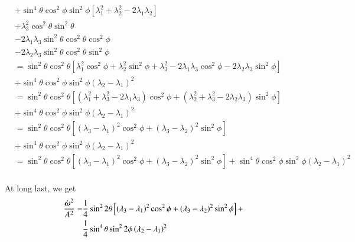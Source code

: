\documentclass[preprint,12pt,authoryear]{elsarticle}
\newcommand{\mitbf}[1]{\hbox{\mathversion{bold}$#1$}}
\begin{document}
\begin{equation}
\begin{aligned}
&+ \sin^4{\theta} \cos^2{\phi}\sin^2{\phi} \left[ \lambda_1^2 + \lambda_2^2 -2 \lambda_1\lambda_2 \right] \\
&+ \lambda_3^2 \cos^2{\theta}\sin^2{\theta} \\
&- 2 \lambda_1 \lambda_3 \sin^2{\theta} \cos^2{\theta} \cos^2{\phi} \\
&- 2 \lambda_2 \lambda_3 \sin^2{\theta} \cos^2{\theta} \sin^2{\phi} \\ 
&=
\sin^2{\theta}\cos^2{\theta} \left[\lambda_1^2 \cos^2{\phi} + \lambda_2^2 \sin^2{\phi} + \lambda_3^2 - 2 \lambda_1 \lambda_3 \cos^2{\phi} - 2 \lambda_2 \lambda_3 \sin^2{\phi} \right] \\
&+ \sin^4{\theta} \cos^2{\phi}\sin^2{\phi} \left( \lambda_2 - \lambda_1 \right)^2 \\
&=
\sin^2{\theta}\cos^2{\theta} \left[( \lambda_1^2 + \lambda_3^2 - 2 \lambda_1 \lambda_3) \cos^2{\phi} + (\lambda_2^2 + \lambda_3^2 - 2 \lambda_2 \lambda_3 ) \sin^2{\phi} \right] \\
&+ \sin^4{\theta} \cos^2{\phi}\sin^2{\phi} \left( \lambda_2 - \lambda_1 \right)^2 \\
&=
\sin^2{\theta}\cos^2{\theta} \left[( \lambda_3 - \lambda_1)^2 \cos^2{\phi} + (\lambda_3 - \lambda_2)^2 \sin^2{\phi} \right] \\
&+ \sin^4{\theta} \cos^2{\phi}\sin^2{\phi} \left( \lambda_2 - \lambda_1 \right)^2 \\
&=
\sin^2{\theta}\cos^2{\theta} \left[( \lambda_3 - \lambda_1)^2 \cos^2{\phi} + (\lambda_3 - \lambda_2)^2 \sin^2{\phi} \right]
+ \sin^4{\theta} \cos^2{\phi}\sin^2{\phi} \left( \lambda_2 - \lambda_1 \right)^2 \\
\end{aligned}
\end{equation}

At long last, we get
\begin{equation}
\begin{aligned}
\frac{\dot{\mitbf{\omega}}^2}{A^2}  = 
&\frac{1}{4}\sin^2{2\theta} \left[( \lambda_3 - \lambda_1)^2 \cos^2{\phi} + (\lambda_3 - \lambda_2)^2 \sin^2{\phi} \right] +\\
&\frac{1}{4}\sin^4{\theta} \sin^2{2\phi}\left( \lambda_2 - \lambda_1 \right)^2 \\
\end{aligned}
\end{equation}

\else
\fi
\end{document}
